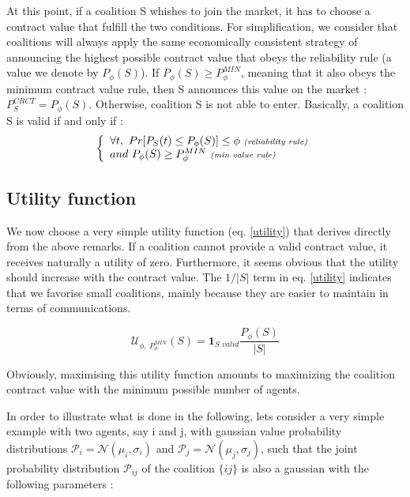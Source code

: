 \documentclass[conference]{IEEEtran}
\begin{document}
At this point, if a coalition S whishes to join the market, it has to choose a contract value that fulfill the two conditions. For simplification, we consider that coalitions will always apply the same economically consistent strategy of announcing the highest possible contract value that obeys the reliability rule (a value we denote by $ P_{\phi}(S) $). If $ P_{\phi}(S) \geq P_{\phi}^{MIN} $, meaning that it also obeys the minimum contract value rule, then S announces this value on the market : $ P_{S}^{CRCT} = P_{\phi}(S) $. Otherwise, coalition S is not able to enter.
Basically, a coalition S is valid if and only if :
\begin{equation}
\left\{ \begin{array}{lll}
		\forall t,\ Pr[ P_{S}(t) \leq P_{\phi}(S)] \leq \phi\ \textit{{\scriptsize (reliability rule)}} \\
		and\ P_{\phi}(S) \geq P_{\phi}^{MIN}\ \textit{{\scriptsize (min value rule)}}

\end{array} \right. 
\label{rules}
\end{equation}

\subsection{Utility function}\label{subsec:UtilityFunc}
We now choose a very simple utility function (eq. \ref{utility}) that derives directly from the above remarks. If a coalition cannot provide a valid contract value, it receives naturally a utility of zero. Furthermore, it seems obvious that the utility should increase with the contract value. The $ 1/|S| $ term in eq. \ref{utility} indicates that we favorise small coalitions, mainly because they are easier to maintain in terms of communications.

\begin{equation}
 \mathcal{U}_{\phi,\ P_{\phi}^{MIN}}(S) = \mathbf{1}_{\textit{S\ valid}} \dfrac{P_{\phi}(S)}{|S|} 
\label{utility}
\end{equation}

Obviously, maximising this utility function amounts to maximizing the coalition contract value with the minimum possible number of agents. 

In order to illustrate what is done in the following, lets consider a very simple example with two agents, say i and j, with gaussian value probability distributions $ \mathcal{P}_{i} = \mathcal{N}(\mu_{i}, \sigma_{i}) $ and $ \mathcal{P}_{j} = \mathcal{N}(\mu_{j}, \sigma_{j}) $, such that the joint probability distribution  $ \mathcal{P}_{ij} $ of the coalition $\{ij\}$ is also a gaussian with the following parameters :
\end{document}
